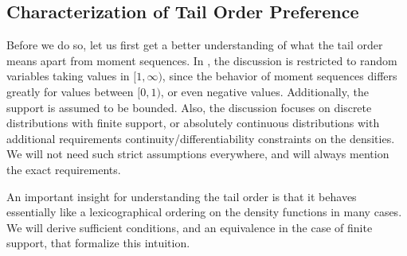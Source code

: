 \documentclass[a4paper]{scrreprt}
\begin{document}
    \subsection{Characterization of Tail Order Preference}
    Before we do so, let us first get a better understanding of what the tail order means apart from moment sequences.
    In \cite{bib:rassGameRiskManagI}, the discussion is restricted to random variables taking values in $[1, \infty)$, since the behavior of moment sequences differs greatly for values between $[0, 1)$, or even negative values. Additionally, the support is assumed to be bounded. Also, the discussion focuses on discrete distributions with finite support, or absolutely continuous distributions with additional requirements continuity/differentiability constraints on the densities.
    We will not need such strict assumptions everywhere, and will always mention the exact requirements.
    
    An important insight for understanding the tail order is that it behaves essentially like a lexicographical ordering on the density functions in many cases.
    We will derive sufficient conditions, and an equivalence in the case of finite support, that formalize this intuition.
    
\end{document}
